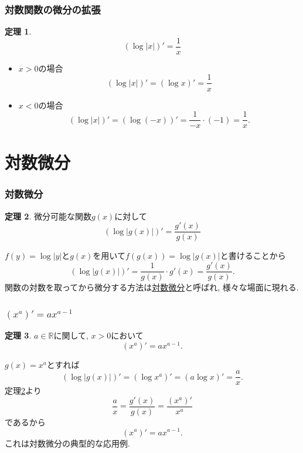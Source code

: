 \documentclass[dvipdfmx,cjk,10.2pt]{beamer}
\newcommand{\R}{\mathbb{R}}
\theoremstyle{definition}
\newtheorem{Thm}{定理}[section]
\begin{document}


\begin{frame}
\frametitle{対数関数の微分の拡張}


\begin{Thm} 
$$(\log |x|)'=\frac{1}{x}$$
\end{Thm}

\begin{itemize}
\item $x>0$の場合
$$
(\log |x|)' = (\log x)'=\frac{1}{x}
$$
\item $x<0$の場合
$$
(\log |x|)' = (\log (-x))'=\frac{1}{-x} \cdot (-1)=\frac{1}{x}. 
$$
\end{itemize}


\end{frame}




\section{対数微分}

\begin{frame}
\frametitle{対数微分}



\begin{Thm} \label{対数微分}
微分可能な関数$g(x)$に対して
$$(\log |g(x)|)'=\frac{g'(x)}{g(x)}$$
\end{Thm}

$f(y)=\log |y|$と$g(x)$を用いて$f(g(x))=\log|g(x)|$と書けることから
$$
(\log |g(x)|)'=\frac{1}{g(x)}\cdot g'(x)=\frac{g'(x)}{g(x)}. 
$$
関数の対数を取ってから微分する方法は\underline{対数微分}と呼ばれ, 様々な場面に現れる. 

\end{frame}




\begin{frame}
\frametitle{$(x^a)'=ax^{a-1}$}



\begin{Thm} 
$a \in \R$に関して, $x>0$において
$$
(x^a)'=ax^{a-1}.
$$
\end{Thm}
$g(x)=x^a$とすれば
$$
(\log |g(x)|)'= (\log x^a)'= (a \log x)'=\frac{a}{x}. 
$$
定理\ref{対数微分}より
$$
\frac{a}{x}=\frac{g'(x)}{g(x)}=\frac{(x^a)'}{x^a}
$$
であるから
$$
(x^a)'=a x^{a-1}. 
$$
これは対数微分の典型的な応用例. 

\end{frame}
\end{document}
